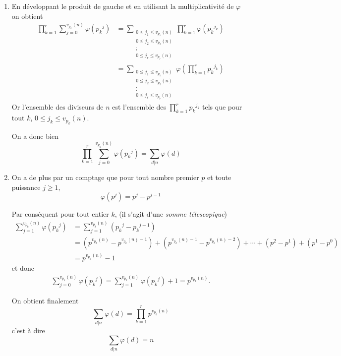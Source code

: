 \begin{sol}
\begin{enumerate}
\item  En développant le produit de gauche et en utilisant la multiplicativité de $\varphi$ on obtient
$$\begin{aligned}
  \prod_{k = 1}^r \sum_{j = 0}^{v_{p_k}(n)} \varphi({p_k}^j) & = \sum_{\substack{ 0 \le j_1 \le v_{p_1}(n) \\ 0 \le j_2 \le v_{p_2}(n) \\ \vdots\\  0 \le j_r \le v_{p_r}(n)
      }}\prod_{k = 1}^r \varphi({p_k}^{j_k})                                                               \\
                                                          & = \sum_{\substack{ 0 \le j_1 \le v_{p_1}(n) \\ 0 \le j_2 \le v_{p_2}(n) \\ \vdots\\  0 \le j_r \le v_{p_r}(n)
      }}\varphi\left(\prod_{k = 1}^r {p_k}^{j_k}\right)
\end{aligned} $$
Or l'ensemble des diviseurs de $n$ est l'ensemble des $\prod_{k = 1}^r {p_k}^{j_k}$ tels que pour tout $k$, $0 \le j_k \le v_{p_k}(n)$.

On a donc bien
$$\boxed{\prod_{k = 1}^r \sum_{j = 0}^{v_{p_k}(n)} \varphi({p_k}^j) = \sum_{d | n} \varphi(d)}$$
\item On a de plus par un comptage que pour tout nombre premier $p$ et toute puissance $j\ge 1$,
$$\varphi(p^j) = p^j-p^{j-1}$$

Par conséquent pour tout entier $k$, (il s'agit d'une \emph{somme télescopique})
$$\begin{aligned}
  \sum_{j = 1}^{v_{p_k}(n)} \varphi({p_k}^j) & = \sum_{j = 1}^{v_{p_k}(n)} \left( {p_k}^j - {p_k}^{j-1}\right)                                                                                                         \\
                                          & = \left(p^{v_{p_k}(n)} - p^{v_{p_k}(n)-1}\right) + \left(p^{v_{p_k}(n)-1} - p^{v_{p_k}(n)-2}\right) + \cdots + \left(p^{2} - p^{1}\right) + \left(p^{1} - p^{0}\right) \\
                                          & = p^{v_{p_k}(n)}-1
\end{aligned} $$
et donc
$$\begin{aligned}
  \sum_{j = 0}^{v_{p_k}(n)} \varphi({p_k}^j) = \sum_{j = 1}^{v_{p_k}(n)} \varphi({p_k}^j) + 1 = p^{v_{p_k}(n)}.
\end{aligned}$$

On obtient finalement
$$ \sum_{d | n} \varphi(d) = \prod_{k = 1}^r p^{v_{p_k}(n)}$$
c'est à dire
$$\boxed{ \sum_{d | n} \varphi(d) = n}$$
\end{enumerate}
\end{sol}

